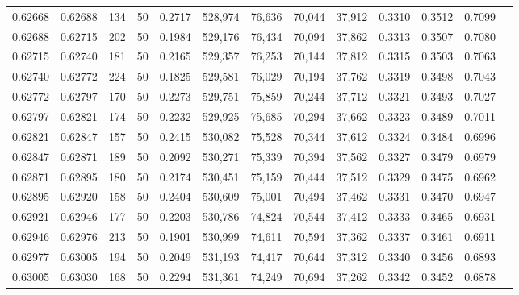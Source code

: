 \begin{tabular}{rrrrrrrrrrrrr}
0.62668 & 0.62688 &   134 &  50 &                                     0.2717 & 528,974 &  76,636 &  70,044 &  37,912 & 0.3310 & 0.3512 & 0.7099 \\
0.62688 & 0.62715 &   202 &  50 &                                     0.1984 & 529,176 &  76,434 &  70,094 &  37,862 & 0.3313 & 0.3507 & 0.7080 \\
0.62715 & 0.62740 &   181 &  50 &                                     0.2165 & 529,357 &  76,253 &  70,144 &  37,812 & 0.3315 & 0.3503 & 0.7063 \\
0.62740 & 0.62772 &   224 &  50 &                                     0.1825 & 529,581 &  76,029 &  70,194 &  37,762 & 0.3319 & 0.3498 & 0.7043 \\
0.62772 & 0.62797 &   170 &  50 &                                     0.2273 & 529,751 &  75,859 &  70,244 &  37,712 & 0.3321 & 0.3493 & 0.7027 \\
0.62797 & 0.62821 &   174 &  50 &                                     0.2232 & 529,925 &  75,685 &  70,294 &  37,662 & 0.3323 & 0.3489 & 0.7011 \\
0.62821 & 0.62847 &   157 &  50 &                                     0.2415 & 530,082 &  75,528 &  70,344 &  37,612 & 0.3324 & 0.3484 & 0.6996 \\
0.62847 & 0.62871 &   189 &  50 &                                     0.2092 & 530,271 &  75,339 &  70,394 &  37,562 & 0.3327 & 0.3479 & 0.6979 \\
0.62871 & 0.62895 &   180 &  50 &                                     0.2174 & 530,451 &  75,159 &  70,444 &  37,512 & 0.3329 & 0.3475 & 0.6962 \\
0.62895 & 0.62920 &   158 &  50 &                                     0.2404 & 530,609 &  75,001 &  70,494 &  37,462 & 0.3331 & 0.3470 & 0.6947 \\
0.62921 & 0.62946 &   177 &  50 &                                     0.2203 & 530,786 &  74,824 &  70,544 &  37,412 & 0.3333 & 0.3465 & 0.6931 \\
0.62946 & 0.62976 &   213 &  50 &                                     0.1901 & 530,999 &  74,611 &  70,594 &  37,362 & 0.3337 & 0.3461 & 0.6911 \\
0.62977 & 0.63005 &   194 &  50 &                                     0.2049 & 531,193 &  74,417 &  70,644 &  37,312 & 0.3340 & 0.3456 & 0.6893 \\
0.63005 & 0.63030 &   168 &  50 &                                     0.2294 & 531,361 &  74,249 &  70,694 &  37,262 & 0.3342 & 0.3452 & 0.6878 \\

\end{tabular}
